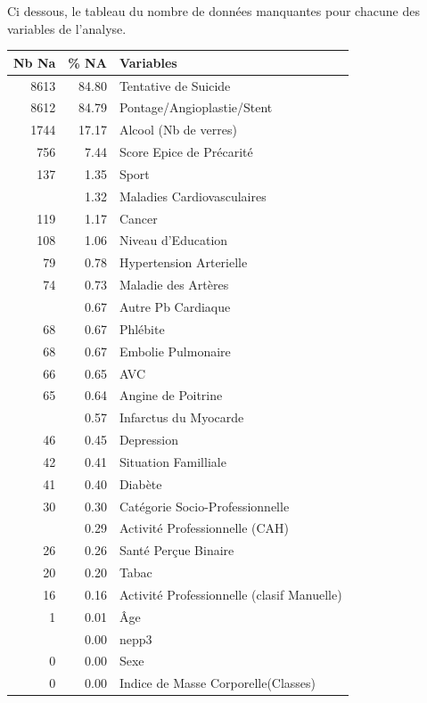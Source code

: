 \documentclass{book}
\begin{document}
\begin{center}
\noindent
Ci dessous, le tableau du nombre de données manquantes pour chacune des variables de l'analyse.\\
\bigskip

\begin{tabular}{rrl}
\toprule
Nb Na & \% NA & Variables\\
\midrule
8613 & 84.80 & Tentative de Suicide\\
8612 & 84.79 & Pontage/Angioplastie/Stent\\
1744 & 17.17 & Alcool (Nb de verres)\\
756 & 7.44 & Score Epice de Précarité\\
137 & 1.35 & Sport\\
\addlinespace
134 & 1.32 & Maladies Cardiovasculaires\\
119 & 1.17 & Cancer\\
108 & 1.06 & Niveau d'Education\\
79 & 0.78 & Hypertension Arterielle\\
74 & 0.73 & Maladie des Artères\\
\addlinespace
68 & 0.67 & Autre Pb Cardiaque\\
68 & 0.67 & Phlébite\\
68 & 0.67 & Embolie Pulmonaire\\
66 & 0.65 & AVC\\
65 & 0.64 & Angine de Poitrine\\
\addlinespace
58 & 0.57 & Infarctus du Myocarde\\
46 & 0.45 & Depression\\
42 & 0.41 & Situation Familliale\\
41 & 0.40 & Diabète\\
30 & 0.30 & Catégorie Socio-Professionnelle\\
\addlinespace
29 & 0.29 & Activité Professionnelle (CAH)\\
26 & 0.26 & Santé Perçue Binaire\\
20 & 0.20 & Tabac\\
16 & 0.16 & Activité Professionnelle (clasif Manuelle)\\
1 & 0.01 & Âge\\
\addlinespace
0 & 0.00 & nepp3\\
0 & 0.00 & Sexe\\
0 & 0.00 & Indice de Masse Corporelle(Classes)\\
\bottomrule
\end{tabular}
\end{center}
\end{document}
